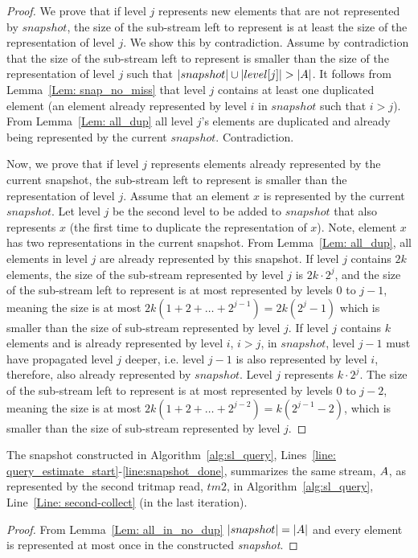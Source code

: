 \begin{proof}
We prove that if level $j$ represents new elements that are not represented by $snapshot$, the size of the sub-stream left to represent is at least the size of the representation of level $j$. We show this by contradiction. Assume by contradiction that the size of the sub-stream left to represent is smaller than the size of the representation of level $j$ such that $|snapshot|\cup |level[j]| > |\mathnormal{A}|$. It follows from Lemma~\ref{Lem: snap_no_miss} that level $j$ contains at least one duplicated element (an element already represented by level $i$ in $snapshot$ such that $i>j$). From Lemma~\ref{Lem: all_dup} all level $j$'s elements are duplicated and already being represented by the current $snapshot$. Contradiction. 

Now, we prove that if level $j$ represents elements already represented by the current snapshot, the sub-stream left to represent is smaller than the representation of level $j$.
Assume that an element $x$ is represented by the current $snapshot$. Let level $j$ be the second level to be added to $snapshot$ that also represents $x$ (the first time to duplicate the representation of $x$). Note, element $x$ has two representations in the current snapshot. From Lemma~\ref{Lem: all_dup}, all elements in level $j$ are already represented by this snapshot.
If level $j$ contains $2k$ elements, the size of the sub-stream represented by level $j$ is $2k\cdot2^j$, and the size of the sub-stream left to represent is at most represented by levels 0 to $j-1$, meaning the size is at most $2k(1+2+\dots+2^{j-1})=2k(2^j-1)$ which is smaller than the size of sub-stream represented by level $j$.
If level $j$ contains $k$ elements and is already represented by level $i$, $i>j$, in $snapshot$, level $j-1$ must have propagated level $j$ deeper, i.e. level $j-1$ is also represented by level $i$, therefore, also already represented by $snapshot$. Level $j$ represents $k\cdot2^j$. The size of the sub-stream left to represent is at most represented by levels 0 to $j-2$, meaning the size is at most $2k(1+2+\dots+2^{j-2})=k(2^{j-1}-2)$, which is smaller than the size of sub-stream represented by level $j$.
\end{proof}


\begin{lemma} \label{Lem: query_estimate}
The snapshot constructed in Algorithm~\ref{alg:sl_query}, Lines~\ref{line: query_estimate_start}-\ref{line:snapshot_done}, summarizes the same stream, $\mathnormal{A}$, as represented by the second tritmap read, $tm2$, in Algorithm~\ref{alg:sl_query}, Line~\ref{Line: second-collect} (in the last iteration).
\end{lemma}
\begin{proof}
From Lemma~\ref{Lem: all_in_no_dup} $|snapshot|=|\mathnormal{A}|$ and every element is represented at most once in the constructed \emph{snapshot}.
\end{proof}
